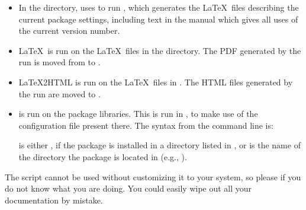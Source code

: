 \begin{itemize}
\item In the  directory, uses  to
	run , which generates the
	\LaTeX\ files describing the current  
	package settings, including text in the manual which gives
	all uses of the current version number.

\item \LaTeX\ is run on the \LaTeX\ files in the  directory.
	The PDF generated by the run is moved from  to
	.

\item \LaTeX{2}HTML is run on the \LaTeX\ files in .
	The HTML files generated by the run are moved to .

\item {} is run on the  package libraries.
	This is run in , to make use of the 
	configuration file present there.  The syntax from the
	command line is:

\begin{codeblock}
\end{codeblock}
\vars{[name]} is either , if the  package is
installed in a directory listed in , or 
\vars{[name]} is the name of the directory the  package is
located in (e.g., ).

\end{itemize}

The  script cannot be used without customizing it
to your system, so please  if you do
not know what you are doing.  You could easily wipe out all your
documentation by mistake.





